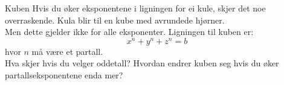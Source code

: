 \begin{surferPage}{Kuben}
Hvis du øker eksponentene i ligningen for ei kule, skjer det noe overraskende. Kula blir til en kube med avrundede hjørner.\\
\vspace{0.3cm}
Men dette gjelder ikke for alle eksponenter. Ligningen til kuben er:
\[x^n+y^n+z^n=b\]
hvor $n$ må være et partall.\\
\vspace{0.3cm}
Hva skjer hvis du velger oddetall? Hvordan endrer kuben seg hvis du øker partallseksponentene enda mer?
\end{surferPage}
